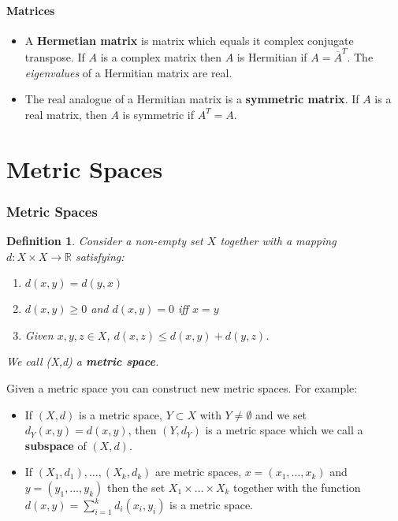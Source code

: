 \documentclass[two column]{article}
\newtheorem{definition}{Definition}[subsection]
\begin{document}
\subsection{Matrices} \label{matrices}

\begin{itemize}
\item A {\bf Hermetian matrix} is matrix which equals it complex conjugate transpose. If $A$ is a complex matrix then $A$ is Hermitian if $A = \overline{A}^{T}$.  The \emph{eigenvalues} of a Hermitian matrix are real. 
\item The real analogue of a Hermitian matrix is a {\bf symmetric matrix}. If $A$ is a real matrix, then $A$ is symmetric if $A^{T} = A$.
\end{itemize}

\part{Metric Spaces}

\section{Metric Spaces}

\begin{definition}
Consider a non-empty set $X$ together with a mapping $d: X \times X \rightarrow \mathbb{R}$ satisfying:
\begin{enumerate}
\item $d(x, y) = d(y,x)$
\item $d(x,y) \geq 0$ and $d(x,y)=0$ iff $x=y$
\item Given $x,y,z \in X$, $d(x,z) \leq d(x,y) + d(y,z)$.
\end{enumerate}
We call (X,d) a {\bf metric space}.
\end{definition}

Given a metric space you can construct new metric spaces. For example:
\begin{itemize}
\item If $(X,d)$ is a metric space, $Y \subset X$ with $Y \neq \emptyset$ and we set $d_{Y}(x,y) = d(x,y)$, then $(Y, d_{Y})$ is a metric space which we call a {\bf subspace} of $(X, d)$. 
\item If $(X_{1}, d_{1}), \dots, (X_{k}, d_{k})$ are metric spaces, $x = (x_{1}, \dots, x_{k})$ and $y = (y_{1}, \dots, y_{k})$ then the set $X_{1} \times \dots \times X_{k}$ together with the function $d(x,y) = \sum_{i=1}^{k} d_{i}(x_{i}, y_{i})$ is a metric space.
\end{itemize}
\end{document}
